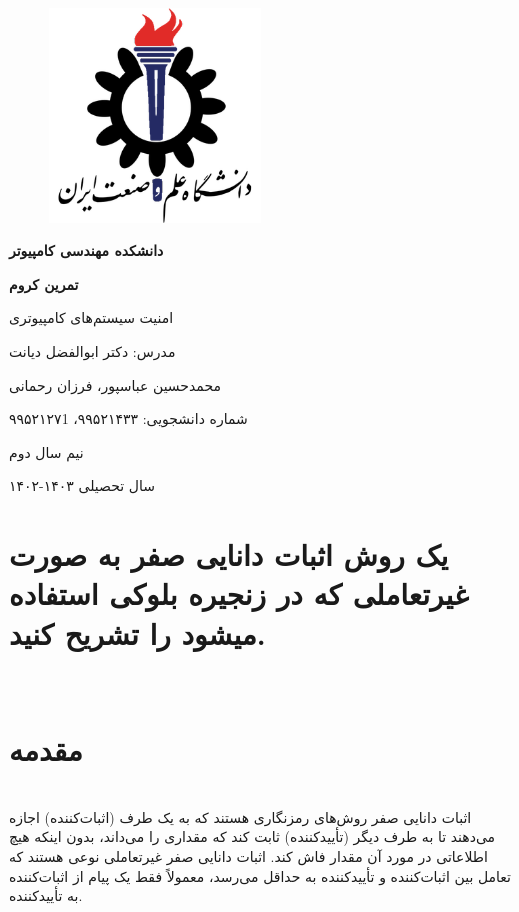 \documentclass{article}
\begin{document}
\begin{titlepage}
    \centering
    \begin{figure}[ht]
        \centering
        \includegraphics[width=0.5\textwidth]{iust.png}
    \end{figure}
    \vspace{1cm}
    {\scshape\Huge \textbf{دانشکده مهندسی کامپیوتر} \par}
    \vspace{1cm}
    {\huge\bfseries تمرین کروم  \par}
    \vspace{1cm}
    {\Large امنیت سیستم‌های کامپیوتری \par}
    \vspace{1cm}
	{\LARGE  مدرس: دکتر ابوالفضل دیانت\par}
    \vspace{1cm}
    {\LARGE  محمدحسین عباسپور، فرزان رحمانی \par}
    \vspace{1cm}
    {\LARGE شماره دانشجویی: ۹۹۵۲۱۴۳۳، ۹۹۵۲۱۲۷1 \par}
    \vspace{1.22cm}
    {\large نیم سال دوم \par}
    {\large سال تحصیلی ۱۴۰۳-۱۴۰۲ \par}
\end{titlepage}
\newpage
\doublespacing
\singlespacing
\newpage
{}
\section*{یک روش اثبات دانایی صفر به صورت غیرتعاملی که در زنجیره بلوکی استفاده میشود را تشریح کنید.} 
\leavevmode 
\\
\section{مقدمه}
\leavevmode
\\
اثبات دانایی صفر  روش‌های رمزنگاری هستند که به یک طرف (اثبات‌کننده) اجازه می‌دهند تا به طرف دیگر (تأییدکننده) ثابت کند که مقداری را می‌داند، بدون اینکه هیچ اطلاعاتی در مورد آن مقدار فاش کند. اثبات دانایی صفر غیرتعاملی  نوعی هستند که تعامل بین اثبات‌کننده و تأییدکننده به حداقل می‌رسد، معمولاً فقط یک پیام از اثبات‌کننده به تأییدکننده.
\end{document}
